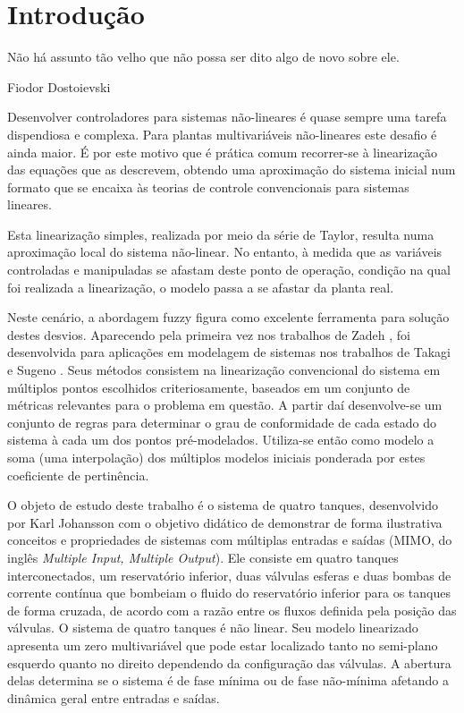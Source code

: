 %

\chapter{Introdução} \label{capIntrod}
\epigraph{Não há assunto tão velho que não possa ser dito algo de novo sobre ele.}{Fiodor Dostoievski}

Desenvolver controladores para sistemas não-lineares é quase sempre uma tarefa dispendiosa e complexa. Para plantas multivariáveis não-lineares este desafio é ainda maior. É por este motivo que é prática comum recorrer-se à linearização das equações que as descrevem, obtendo uma aproximação do sistema inicial num formato que se encaixa às teorias de controle convencionais para sistemas lineares.

Esta linearização simples, realizada por meio da série de Taylor, resulta numa aproximação local do sistema não-linear. No entanto, à medida que as variáveis controladas e manipuladas se afastam deste ponto de operação, condição na qual foi realizada a linearização, o modelo passa a se afastar da planta real.

Neste cenário, a abordagem fuzzy figura como excelente ferramenta para solução destes desvios. Aparecendo pela primeira vez nos trabalhos de Zadeh \cite{zadeh}, foi desenvolvida para aplicações em modelagem de sistemas nos trabalhos de Takagi e Sugeno \cite{takagiSugeno}. Seus métodos consistem na linearização convencional do sistema em múltiplos pontos escolhidos criteriosamente, baseados em um conjunto de métricas relevantes para o problema em questão. A partir daí desenvolve-se um conjunto de regras para determinar o grau de conformidade de cada estado do sistema à cada um dos pontos pré-modelados. Utiliza-se então como modelo a soma (uma interpolação) dos múltiplos modelos iniciais ponderada por estes coeficiente de pertinência. 

O objeto de estudo deste trabalho é o sistema de quatro tanques, desenvolvido por Karl Johansson \cite{johansson2} com o objetivo didático de demonstrar de forma ilustrativa conceitos e propriedades de sistemas com múltiplas entradas e saídas (MIMO, do inglês \textit{Multiple Input, Multiple Output}). Ele consiste em quatro tanques interconectados, um reservatório inferior, duas válvulas esferas e duas bombas de corrente contínua que bombeiam o fluido do reservatório inferior para os tanques de forma cruzada, de acordo com a razão entre os fluxos definida pela posição das válvulas. O sistema de quatro tanques é não linear. Seu modelo linearizado apresenta um zero multivariável que pode estar localizado tanto no semi-plano esquerdo quanto no  direito dependendo da configuração das válvulas. A abertura delas determina se o sistema é de fase mínima ou de fase não-mínima afetando a dinâmica geral entre entradas e saídas.

